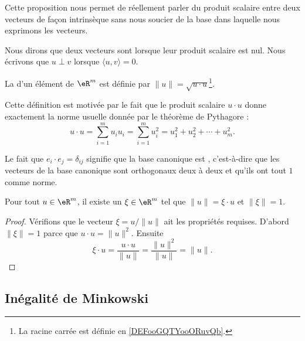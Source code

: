 Cette proposition nous permet de réellement parler du produit scalaire entre deux vecteurs de façon intrinsèque sans nous soucier de la base dans laquelle nous exprimons les vecteurs.

Nous dirons que deux vecteurs sont  lorsque leur produit scalaire est nul. Nous écrivons que \( u\perp v\) lorsque \( \langle u, v\rangle =0\).
\begin{definition}      \label{DefNormeEucleApp}
    La  d'un élément de $\eR^m$ est définie par $\| u \|=\sqrt{u\cdot u}$\footnote{La racine carrée est définie en \ref{DEFooGQTYooORuvQb}.}.
\end{definition}

Cette définition est motivée par le fait que le produit scalaire $u\cdot u$ donne exactement la norme usuelle donnée par le théorème de Pythagore :
\begin{equation}
    u\cdot u=\sum_{i=1}^mu_iu_i=\sum_{i=1}^m u_i^2=u_1^2+u_2^2+\cdots+u_m^2.
\end{equation}

Le fait que $e_i\cdot e_j=\delta_{ij}$ signifie que la base canonique est , c'est-à-dire que les vecteurs de la base canonique sont orthogonaux deux à deux et qu'ils ont tout $1$ comme norme.

\begin{lemma}\label{LemSclNormeXi}
    Pour tout $u\in\eR^m$, il existe un $\xi\in\eR^m$ tel que $\| u \|=\xi\cdot u$ et $\| \xi \|=1$.
\end{lemma}

\begin{proof}
    Vérifions que le vecteur $\xi=u/\| u \|$ ait les propriétés requises. D'abord $\| \xi \|=1$ parce que $u\cdot u=\| u \|^2$. Ensuite
    \begin{equation}
        \xi\cdot u=\frac{ u\cdot u }{ \| u \| }=\frac{ \| u \|^2 }{ \| u \| }=\| u \|.
    \end{equation}
\end{proof}

\subsection{Inégalité de Minkowski}

